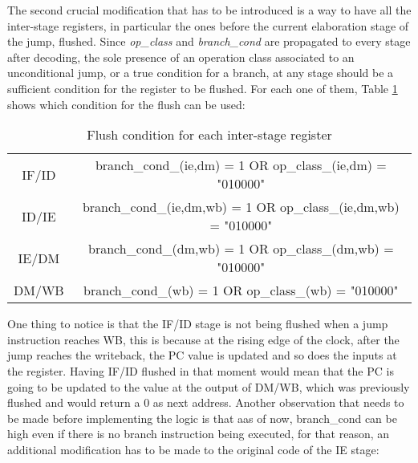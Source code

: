 The second crucial modification that has to be introduced is a way to have all the inter-stage registers, in particular the ones before the current elaboration stage of the jump, flushed. Since \emph{op{\_}class} and \emph{branch{\_}cond} are propagated to every stage after decoding, the sole presence of an operation class associated to an unconditional jump, or a true condition for a branch, at any stage should be a sufficient condition for the register to be flushed. For each one of them, Table \ref{table:flush_logic} shows which condition for the flush can be used: 

\begin{table}[!ht]
    \begin{center}
        \begin{tabular}{|c|c|}
            \hline
            IF/ID &  branch{\_}cond{\_}(ie,dm) = 1 OR op{\_}class{\_}(ie,dm) = "010000"   \\
            
            ID/IE &  branch{\_}cond{\_}(ie,dm,wb) = 1 OR op{\_}class{\_}(ie,dm,wb) = "010000"   \\
            
            IE/DM & branch{\_}cond{\_}(dm,wb) = 1 OR op{\_}class{\_}(dm,wb) = "010000"\\
            
            DM/WB & branch{\_}cond{\_}(wb) = 1 OR op{\_}class{\_}(wb) = "010000"\\
            
            \hline
        \end{tabular}
    \caption{Flush condition for each inter-stage register}
    \label{table:flush_logic}
    \end{center}
\end{table}
\newpage
One thing to notice is that the IF/ID stage is not being flushed when a jump instruction reaches WB, this is because at the rising edge of the clock, after the jump reaches the writeback, the PC value is updated and so does the inputs at the register. Having IF/ID flushed in that moment would mean that the PC is going to be updated to the value at the output of DM/WB, which was previously flushed and would return a 0 as next address.
Another observation that needs to be made before implementing the logic is that aas of now, branch{\_}cond can be high even if there is no branch instruction being executed, for that reason, an additional modification has to be made to the original code of the IE stage:

